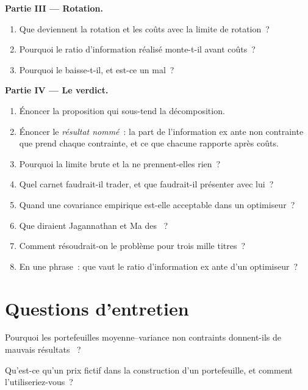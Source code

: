 \begin{problem}
\medskip\noindent\textbf{Partie III --- Rotation.}
\begin{enumerate}[resume]
\item Que deviennent la rotation et les coûts avec la limite de rotation~?
\item Pourquoi le ratio d'information réalisé monte-t-il avant coûts~?
\item Pourquoi le  baisse-t-il, et est-ce un mal~?
\end{enumerate}

\medskip\noindent\textbf{Partie IV --- Le verdict.}
\begin{enumerate}[resume]
\item Énoncer la proposition qui sous-tend la décomposition.
\item Énoncer le \emph{résultat nommé}~: la part de l'information ex ante non contrainte que prend chaque contrainte, et ce que chacune rapporte après coûts.
\item Pourquoi la limite brute et la  ne prennent-elles rien~?
\item Quel carnet faudrait-il trader, et que faudrait-il présenter avec lui~?
\item Quand une covariance empirique est-elle acceptable dans un optimiseur~?
\item Que diraient Jagannathan et Ma des ~?
\item Comment résoudrait-on le problème pour trois mille titres~?
\item En une phrase~: que vaut le ratio d'information ex ante d'un optimiseur~?
\end{enumerate}
\end{problem}

\section{Questions d'entretien}

\begin{interviewq}\label{iq:rs:portfolio-construction-i:1}
Pourquoi les portefeuilles moyenne--variance non contraints donnent-ils de mauvais résultats ~?
\end{interviewq}

\begin{interviewq}\label{iq:rs:portfolio-construction-i:2}
Qu'est-ce qu'un prix fictif dans la construction d'un portefeuille, et comment l'utiliseriez-vous~?
\end{interviewq}


